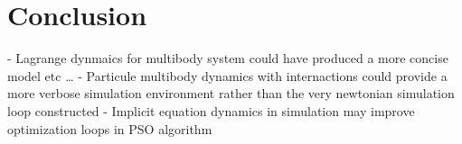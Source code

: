 \chapter{Conclusion}
\label{ch:conclusion}
- Lagrange dynmaics for multibody system could have produced a more concise model etc \ldots
- Particule multibody dynamics with internactions could provide a more verbose simulation environment rather than the very newtonian simulation loop constructed
- Implicit equation dynamics in simulation may improve optimization loops in PSO algorithm
